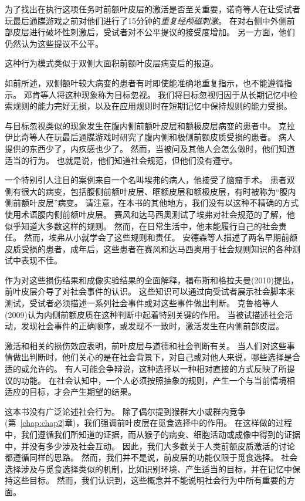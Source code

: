 为了找出在执行这项任务时前额叶皮层的激活是否至关重要，诺奇等人\cite{knoch2006diminishing}在让受试者玩最后通牒游戏之前对他们进行了15分钟的\textit{重复经颅磁刺激}。
在对右侧中外侧前部皮层进行破坏性刺激后，受试者对不公平提议的接受度增加。
另一方面，他们仍然认为这些提议不公平。


这种行为模式类似于双侧大面积前额叶皮层病变后的报道。


如前所述，双侧额叶较大病变的患者有时即使能准确地重复指示，也不能遵循指示。
邓肯等人\cite{duncan2008goal}将这种现象称为目标忽视。
我们将目标忽视归因于从长期记忆中检索规则的能力完好无损，以及在应用规则时在短期记忆中保持规则的能力受损。


与目标忽视类似的现象发生在腹内侧前额叶皮层和额极皮层病变的患者中。
克拉伊比奇等人\cite{krajbich2009economic}在玩最后通牒游戏时研究了腹内侧和极侧前额皮质受损的患者。
病人提供的东西少了，内疚感也少了。
然而，当被问及其他人会怎么做时，他们知道适当的行为。
也就是说，他们知道社会规范，但他们没有遵守。


一个特别引人注目的案例来自一个名叫埃弗的病人，他接受了脑瘤手术。
患者双侧有很大的病变，包括腹侧前额叶皮层、眶额皮层和额极皮层，有时被称为“腹内侧前额叶皮层”病变。
请注意，在本书的其他地方，我们没有以这种不精确的方式使用术语腹内侧前额叶皮层。
赛风和达马西奥\cite{saver1991preserved}测试了埃弗对社会规范的了解，他似乎知道大多数这样的规则。
然而，在日常生活中，他未能履行自己的社会责任\cite{eslinger1985severe}。
然而，埃弗从小就学会了这些规则和责任。
安德森等人\cite{anderson2013impairment}描述了两名早期前额皮质受损的患者，成年后，这些患者在赛风和达马西奥\cite{saver1991preserved}用于社会规则知识的各种测试中表现不佳。


作为对这些损伤结果和成像实验结果的全面解释，福布斯和格拉夫曼(2010)提出，前叶皮层介导了对社会事件的认识。
这些知识可以通过向受试者展示社会脚本来测试，受试者必须描述一系列社会事件或对这些事件做出判断。
克鲁格等人(2009)认为内侧前额皮质在这种判断中起着特别关键的作用。
当被试描述社会活动，发现社会事件的正确顺序，或发现不一致时，激活发生在内侧前部皮层。


激活和相关的损伤效应表明，前叶皮层与道德和社会判断有关。
当人们对这些事情做出判断时，他们关心的是在社会背景下，对自己或对他人来说，哪些选择是合适的或允许的。
有人可能会争辩说，这种选择以一种相对直接的方式反映了所提议的功能。
在社会认知中，一个人必须按照抽象的规则，产生一个与当前情境相适应的目标，才会产生期望的结果。


这本书没有广泛论述社会行为。
除了偶尔提到猴群大小或群内竞争(第~\ref{chap:chap2}章)，我们强调前叶皮层在觅食选择中的作用。
在这样做的过程中，我们遵循我们所知道的证据，而从猴子的病变、细胞活动或成像中得到的证据中，并没有多少涉及社会互动。
因此，我们大多数关于人类前额皮质激活的讨论都遵循同样的思路。
然而，我们并不是说，前皮层的功能仅限于觅食选择。
社会选择涉及与觅食选择类似的机制，比如识别环境、产生适当的目标，并在记忆中保持这些目标。
然而，我们认识到，这些概念并不能说明社会行为中所有重要的方面。


